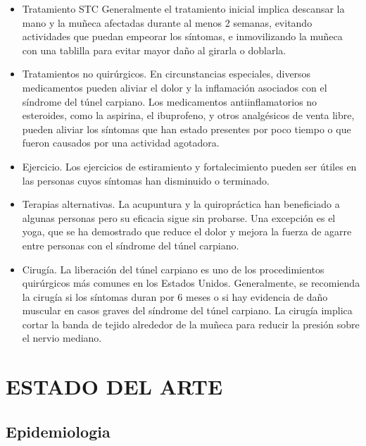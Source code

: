 \documentclass[a4paper,man,natbib]{apa6}
\begin{document}
\begin{itemize}
\item Tratamiento STC
Generalmente el tratamiento inicial implica descansar la mano y la muñeca afectadas durante al menos 2 semanas, evitando actividades que puedan empeorar los síntomas, e inmovilizando la muñeca con una tablilla para evitar mayor daño al girarla o doblarla. 
\item Tratamientos no quirúrgicos.
En circunstancias especiales, diversos medicamentos pueden aliviar el dolor y la inflamación asociados con el síndrome del túnel carpiano. Los medicamentos antiinflamatorios no esteroides, como la aspirina, el ibuprofeno, y otros analgésicos de venta libre, pueden aliviar los síntomas que han estado presentes por poco tiempo o que fueron causados por una actividad agotadora.
\item Ejercicio.
Los ejercicios de estiramiento y fortalecimiento pueden ser útiles en las personas cuyos síntomas han disminuido o terminado.
\item Terapias alternativas.
La acupuntura y la quiropráctica han beneficiado a algunas personas pero su eficacia sigue sin probarse. Una excepción es el yoga, que se ha demostrado que reduce el dolor y mejora la fuerza de agarre entre personas con el síndrome del túnel carpiano.

\item Cirugía.
La liberación del túnel carpiano es uno de los procedimientos quirúrgicos más comunes en los Estados Unidos. Generalmente, se recomienda la cirugía si los síntomas duran por 6 meses o si hay evidencia de daño muscular en casos graves del síndrome del túnel carpiano. La cirugía implica cortar la banda de tejido alrededor de la muñeca para reducir la presión sobre el nervio mediano.

\end{itemize}


\section{ESTADO DEL ARTE}
\subsection{Epidemiologia }
 
\end{document}
